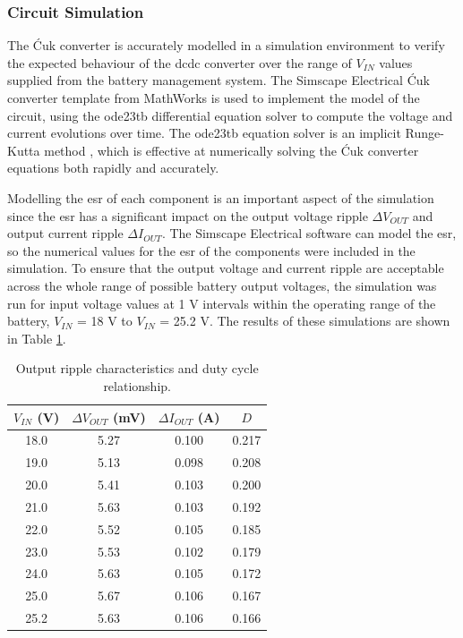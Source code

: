 \subsubsection{Circuit Simulation}

The Ćuk converter is accurately modelled in a simulation environment to verify the expected behaviour of the \acrshort{dcdc} converter over the range of $V_{IN}$ values supplied from the battery management system. The Simscape Electrical Ćuk converter template from MathWorks is used to implement the model of the circuit, using the ode23tb differential equation solver to compute the voltage and current evolutions over time. The ode23tb equation solver is an implicit Runge-Kutta method \cite{matlab_ode23tb}, which is effective at numerically solving the Ćuk converter equations both rapidly and accurately.

Modelling the \gls{esr} of each component is an important aspect of the simulation since the \acrshort{esr} has a significant impact on the output voltage ripple $\Delta V_{OUT}$ and output current ripple $\Delta I_{OUT}$. The Simscape Electrical software can model the \acrshort{esr}, so the numerical values for the \acrshort{esr} of the components were included in the simulation. To ensure that the output voltage and current ripple are acceptable across the whole range of possible battery output voltages, the simulation was run for input voltage values at 1 V intervals within the operating range of the battery, $V_{IN}$ = 18 V to $V_{IN}$ = 25.2 V. The results of these simulations are shown in Table \ref{tab:converter_performance}.

\begin{table}[h]
    \centering
    \renewcommand{\arraystretch}{1.2}
    \begin{tabular}{cccc}
        \toprule
        $V_{IN}$ (V) & $\Delta V_{OUT}$ (mV) & $\Delta I_{OUT}$ (A) & $D$ \\
        \midrule
        18.0 & 5.27 & 0.100 & 0.217 \\
        19.0 & 5.13 & 0.098 & 0.208 \\
        20.0 & 5.41 & 0.103 & 0.200 \\
        21.0 & 5.63 & 0.103 & 0.192 \\
        22.0 & 5.52 & 0.105 & 0.185 \\
        23.0 & 5.53 & 0.102 & 0.179 \\
        24.0 & 5.63 & 0.105 & 0.172 \\
        25.0 & 5.67 & 0.106 & 0.167 \\
        25.2 & 5.63 & 0.106 & 0.166 \\
        \bottomrule
    \end{tabular}
    \caption{Output ripple characteristics and duty cycle relationship.}
    \label{tab:converter_performance}
\end{table}


